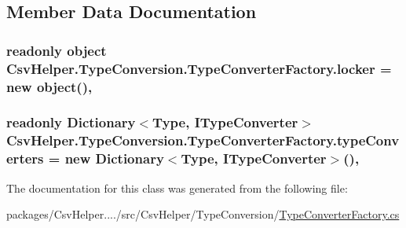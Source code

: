 \subsection{Member Data Documentation}
\hypertarget{a00151_aae823641d64f44cf1a79573bb55a5090}{
\subsubsection[{locker}]{\setlength{\rightskip}{0pt plus 5cm}readonly object Csv\-Helper.\-Type\-Conversion.\-Type\-Converter\-Factory.\-locker = new object()\hspace{0.3cm}{\ttfamily [static]}, {\ttfamily [private]}}}\label{a00151_aae823641d64f44cf1a79573bb55a5090}
\hypertarget{a00151_a5229fe94e2acf6302b733c3d114f187e}{
\subsubsection[{type\-Converters}]{\setlength{\rightskip}{0pt plus 5cm}readonly Dictionary$<$Type, {\bf I\-Type\-Converter}$>$ Csv\-Helper.\-Type\-Conversion.\-Type\-Converter\-Factory.\-type\-Converters = new Dictionary$<$Type, {\bf I\-Type\-Converter}$>$()\hspace{0.3cm}{\ttfamily [static]}, {\ttfamily [private]}}}\label{a00151_a5229fe94e2acf6302b733c3d114f187e}


The documentation for this class was generated from the following file\-:\begin{DoxyCompactItemize}
\item 
packages/\-Csv\-Helper..../src/\-Csv\-Helper/\-Type\-Conversion/\hyperlink{a00241}{Type\-Converter\-Factory.\-cs}\end{DoxyCompactItemize}
